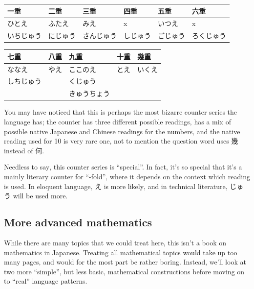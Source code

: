 \documentclass[11pt, b5paper, twoside, openright, onecolumn]{book}
\newenvironment{mytabular}[1]{\noindent\hspace{0.4in}
\begin{tabular}[h]{#1}}{\end{tabular}}
\begin{document}
\vspace{0.5cm}
\smaller
\begin{mytabular}{| l  l  l  l  l  l |}\hline 
\rule{0pt}{2.4ex}一重 & 二重 & 三重 & 四重 & 五重 & 六重\\ 
\hline
\rule{0pt}{2.4ex}ひとえ & ふたえ & みえ & x & いつえ & x\\ 
\rule{0pt}{2.4ex}いちじゅう & にじゅう & さんじゅう & しじゅう & ごじゅう & ろくじゅう\\ 
\hline 
\end{mytabular}
\larger
\vspace{0.5cm}

\smaller
\begin{mytabular}{| l  l  l  l  l |}\hline 
\rule{0pt}{2.4ex}七重 & 八重 & 九重 & 十重 & 幾重\\ 
\hline
\rule{0pt}{2.4ex}ななえ & やえ & ここのえ & とえ & いくえ\\ 
\rule{0pt}{2.4ex}しちじゅう &  & くじゅう &  & \\ 
\rule{0pt}{2.4ex} &  & きゅうちょう &  & \\ 
\hline 
\end{mytabular}
\larger
\vspace{0.5cm}


You may have noticed that this is perhaps the most bizarre counter series the language has; the counter has three different possible readings‚ has a mix of possible native Japanese and Chinese readings for the numbers‚ and the native reading used for 10 is very rare one‚ not to mention the question word uses 幾 instead of 何. 

Needless to say‚ this counter series is “special”. In fact‚ it’s so special that it’s a mainly literary counter for “-fold”‚ where it depends on the context which reading is used. In eloquent language‚ え is more likely‚ and in technical literature‚ じゅう will be used more.

\subsection{More advanced mathematics}

While there are many topics that we could treat here‚ this isn’t a book on mathematics in Japanese. Treating all mathematical topics would take up too many pages‚ and would for the most part be rather boring. Instead‚ we’ll look at two more “simple”‚ but less basic‚ mathematical constructions before moving on to “real” language patterns.
\end{document}
